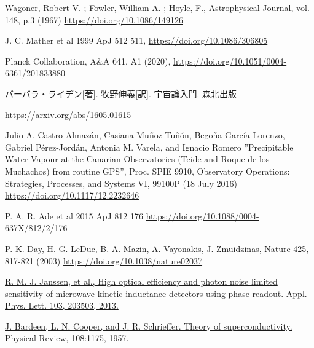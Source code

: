 \begin{thebibliography}{99}

Wagoner, Robert V. ; Fowler, William A. ; Hoyle, F., Astrophysical Journal, vol. 148, p.3 (1967)
\href{https://doi.org/10.1086/149126}{https://doi.org/10.1086/149126}

J. C. Mather et al 1999 ApJ 512 511,
\href{https://doi.org/10.1086/306805}{https://doi.org/10.1086/306805}

Planck Collaboration, A$\&$A 641, A1 (2020),
\href{https://doi.org/10.1051/0004-6361/201833880}{https://doi.org/10.1051/0004-6361/201833880}

バーバラ・ライデン[著]. 牧野伸義[訳]. 宇宙論入門. 森北出版

\href{https://arxiv.org/abs/1605.01615}{https://arxiv.org/abs/1605.01615}

Julio A. Castro-Almaz\'{a}n, Casiana Mu\~{n}oz-Tu\~{n}\'{o}n, Bego\~{n}a Garc\'{i}a-Lorenzo, Gabriel P\'{e}rez-Jord\'{a}n, Antonia M. Varela, and Ignacio Romero ”Precipitable Water Vapour at the Canarian Observatories (Teide and Roque de los Muchachos) from routine GPS”, Proc. SPIE 9910, Observatory Operations: Strategies, Processes, and Systems VI, 99100P (18 July 2016)
\href{https://doi.org/10.1117/12.2232646}{https://doi.org/10.1117/12.2232646}

P. A. R. Ade et al 2015 ApJ 812 176
\href{https://doi.org/10.1088/0004-637X/812/2/176}{https://doi.org/10.1088/0004-637X/812/2/176}

P. K. Day, H. G. LeDuc, B. A. Mazin, A. Vayonakis, J. Zmuidzinas, Nature 425,
817-821 (2003)
\href{https://doi.org/10.1038/nature02037}{https://doi.org/10.1038/nature02037}

\href{https://pubs.aip.org/aip/apl/article-abstract/103/20/203503/130528/High-optical-efficiency-and-photon-noise-limited?redirectedFrom=fulltext}{R. M. J. Janssen, et al., High optical efficiency and photon noise limited sensitivity of microwave kinetic inductance detectors using phase readout. Appl. Phys. Lett. 103, 203503, 2013.}

\href{https://journals.aps.org/pr/abstract/10.1103/PhysRev.108.1175}
{J. Bardeen, L. N. Cooper, and J. R. Schrieffer. Theory of superconductivity. Physical Review, 108:1175, 1957.}


\end{thebibliography}
